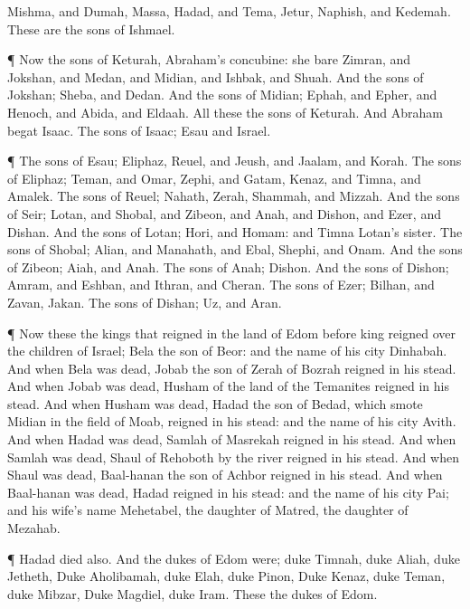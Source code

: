 {Mishma, and
Dumah,
Massa,
Hadad, and
Tema,
Jetur,
Naphish, and
Kedemah. These are the
sons of
Ishmael.
\par }{\PP {}¶ Now the
sons of
Keturah,
Abraham’s
concubine: she
bare
Zimran, and
Jokshan, and
Medan, and
Midian, and
Ishbak, and
Shuah. And the
sons of
Jokshan;
Sheba, and
Dedan.
And the
sons of
Midian;
Ephah, and
Epher, and
Henoch, and
Abida, and
Eldaah. All these
{} the
sons of
Keturah.
And
Abraham
begat
Isaac. The
sons of
Isaac;
Esau and
Israel.
\par }{\PP {}¶ The
sons of
Esau;
Eliphaz,
Reuel, and
Jeush, and
Jaalam, and
Korah.
The
sons of
Eliphaz;
Teman, and
Omar,
Zephi, and
Gatam,
Kenaz, and
Timna, and
Amalek.
The
sons of
Reuel;
Nahath,
Zerah,
Shammah, and
Mizzah.
And the
sons of
Seir;
Lotan, and
Shobal, and
Zibeon, and
Anah, and
Dishon, and
Ezer, and
Dishan.
And the
sons of
Lotan;
Hori, and
Homam: and
Timna
{}
Lotan’s
sister.
The
sons of
Shobal;
Alian, and
Manahath, and
Ebal,
Shephi, and
Onam. And the
sons of
Zibeon;
Aiah, and
Anah.
The
sons of
Anah;
Dishon. And the
sons of
Dishon;
Amram, and
Eshban, and
Ithran, and
Cheran.
The
sons of
Ezer;
Bilhan, and
Zavan,
{}
Jakan. The
sons of
Dishan;
Uz, and
Aran.
\par }{\PP {}¶ Now these
{} the
kings that
reigned in the
land of
Edom
before
{}
king
reigned over the
children of
Israel;
Bela the
son of
Beor: and the
name of his
city
{}
Dinhabah.
And when
Bela was
dead,
Jobab the
son of
Zerah of
Bozrah
reigned in his stead.
And when
Jobab was
dead,
Husham of the
land of the
Temanites
reigned in his stead.
And when
Husham was
dead,
Hadad the
son of
Bedad, which
smote
Midian in the
field of
Moab,
reigned in his stead: and the
name of his
city
{}
Avith.
And when
Hadad was
dead,
Samlah of
Masrekah
reigned in his stead.
And when
Samlah was
dead,
Shaul of
Rehoboth by the
river
reigned in his stead.
And when
Shaul was
dead,
Baal-hanan the
son of
Achbor
reigned in his stead.
And when
Baal-hanan was
dead,
Hadad
reigned in his stead: and the
name of his
city
{}
Pai; and his
wife’s
name
{}
Mehetabel, the
daughter of
Matred, the
daughter of
Mezahab.
\par }{\PP {}¶
Hadad
died also. And the
dukes of
Edom were;
duke
Timnah,
duke
Aliah,
duke
Jetheth,
Duke
Aholibamah,
duke
Elah,
duke
Pinon,
Duke
Kenaz,
duke
Teman,
duke
Mibzar,
Duke
Magdiel,
duke
Iram. These
{} the
dukes of
Edom.

}
